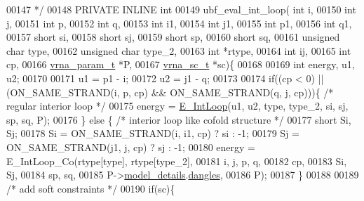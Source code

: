\begin{DoxyCode}
00147 \textcolor{comment}{ */}
00148 PRIVATE INLINE \textcolor{keywordtype}{int}
00149 ubf\_eval\_int\_loop(  \textcolor{keywordtype}{int} i,
00150                     \textcolor{keywordtype}{int} j,
00151                     \textcolor{keywordtype}{int} p,
00152                     \textcolor{keywordtype}{int} q,
00153                     \textcolor{keywordtype}{int} i1,
00154                     \textcolor{keywordtype}{int} j1,
00155                     \textcolor{keywordtype}{int} p1,
00156                     \textcolor{keywordtype}{int} q1,
00157                     \textcolor{keywordtype}{short} si,
00158                     \textcolor{keywordtype}{short} sj,
00159                     \textcolor{keywordtype}{short} sp,
00160                     \textcolor{keywordtype}{short} sq,
00161                     \textcolor{keywordtype}{unsigned} \textcolor{keywordtype}{char} type,
00162                     \textcolor{keywordtype}{unsigned} \textcolor{keywordtype}{char} type\_2,
00163                     \textcolor{keywordtype}{int} *rtype,
00164                     \textcolor{keywordtype}{int} ij,
00165                     \textcolor{keywordtype}{int} cp,
00166                     \hyperlink{group__energy__parameters_structvrna__param__s}{vrna\_param\_t} *P,
00167                     \hyperlink{group__soft__constraints_structvrna__sc__s}{vrna\_sc\_t} *sc)\{
00168 
00169   \textcolor{keywordtype}{int} energy, u1, u2;
00170 
00171   u1 = p1 - i;
00172   u2 = j1 - q;
00173 
00174   \textcolor{keywordflow}{if}((cp < 0) || (ON\_SAME\_STRAND(i, p, cp) && ON\_SAME\_STRAND(q, j, cp)))\{ \textcolor{comment}{/* regular interior loop */}
00175     energy = \hyperlink{group__loops_gaafbc187b7f78e8e82afb77dd6f3b8fc5}{E\_IntLoop}(u1, u2, type, type\_2, si, sj, sp, sq, P);
00176   \} \textcolor{keywordflow}{else} \{ \textcolor{comment}{/* interior loop like cofold structure */}
00177     \textcolor{keywordtype}{short} Si, Sj;
00178     Si  = ON\_SAME\_STRAND(i, i1, cp) ? si : -1;
00179     Sj  = ON\_SAME\_STRAND(j1, j, cp) ? sj : -1;
00180     energy = E\_IntLoop\_Co(rtype[type], rtype[type\_2],
00181                             i, j, p, q,
00182                             cp,
00183                             Si, Sj,
00184                             sp, sq,
00185                             P->\hyperlink{group__energy__parameters_a7b84353eb9075c595bad4ceb871bcae7}{model\_details}.\hyperlink{structvrna__md__s_adcda4ff2ea77748ae0e8700288282efc}{dangles},
00186                             P);
00187   \}
00188 
00189   \textcolor{comment}{/* add soft constraints */}
00190   \textcolor{keywordflow}{if}(sc)\{

\end{DoxyCode}
